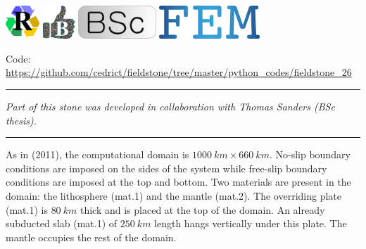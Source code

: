 \includegraphics[height=1.25cm]{images/pictograms/replication}
\includegraphics[height=1.25cm]{images/pictograms/benchmark}
\includegraphics[height=1.25cm]{images/pictograms/bsc}
\includegraphics[height=1.25cm]{images/pictograms/FEM}




\begin{center}
\inpython
{\small Code: \url{https://github.com/cedrict/fieldstone/tree/master/python_codes/fieldstone_26}}
\end{center}


\par\noindent\rule{\textwidth}{0.4pt}

{\sl Part of this stone was developed in collaboration with Thomas Sanders (BSc thesis).} 

\par\noindent\rule{\textwidth}{0.4pt}



As in \textcite{schm11} (2011), the computational domain is $1000~\si{km} \times 660~\si{km}$.
No-slip boundary conditions are imposed on the sides of the system while free-slip
boundary conditions are imposed at the top and bottom.
Two materials are present in the domain: the lithosphere (mat.1) and the mantle (mat.2). 
The overriding plate (mat.1) is $80~\si{km}$ thick and is placed at the top of the domain. 
An already subducted slab (mat.1) of $250~\si{km}$ length hangs vertically under this plate.
The mantle occupies the rest of the domain.

